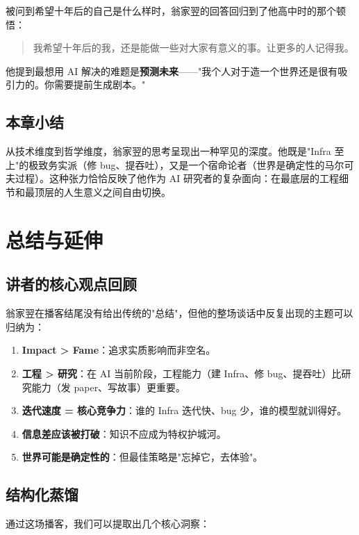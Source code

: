 \documentclass[a4paper]{article}
\begin{document}
被问到希望十年后的自己是什么样时，翁家翌的回答回归到了他高中时的那个顿悟：

\begin{quote}
我希望十年后的我，还是能做一些对大家有意义的事。让更多的人记得我。
\end{quote}

他提到最想用 AI 解决的难题是\textbf{预测未来}——"我个人对于造一个世界还是很有吸引力的。你需要提前生成剧本。"

\subsection{本章小结}
从技术维度到哲学维度，翁家翌的思考呈现出一种罕见的深度。他既是"Infra 至上"的极致务实派（修 bug、提吞吐），又是一个宿命论者（世界是确定性的马尔可夫过程）。这种张力恰恰反映了他作为 AI 研究者的复杂面向：在最底层的工程细节和最顶层的人生意义之间自由切换。

\section{总结与延伸}

\subsection{讲者的核心观点回顾}

翁家翌在播客结尾没有给出传统的"总结"，但他的整场谈话中反复出现的主题可以归纳为：

\begin{enumerate}
\item \textbf{Impact > Fame}：追求实质影响而非空名。
\item \textbf{工程 > 研究}：在 AI 当前阶段，工程能力（建 Infra、修 bug、提吞吐）比研究能力（发 paper、写故事）更重要。
\item \textbf{迭代速度 = 核心竞争力}：谁的 Infra 迭代快、bug 少，谁的模型就训得好。
\item \textbf{信息差应该被打破}：知识不应成为特权护城河。
\item \textbf{世界可能是确定性的}：但最佳策略是"忘掉它，去体验"。
\end{enumerate}

\subsection{结构化蒸馏}

通过这场播客，我们可以提取出几个核心洞察：
\end{document}
